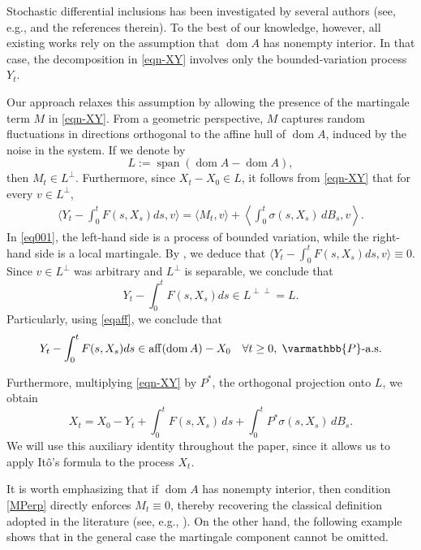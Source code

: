 \documentclass[11pt,reqno]{article}
\let\mathbb=\varmathbb
\newcommand{\dom}{\operatorname{dom}}
\newcommand{\1}{\mathds{1}}
\DeclareMathOperator{\aff}{aff}
\numberwithin{equation}{section}  %
\theoremstyle{plain}
\theoremstyle{definition}
\theoremstyle{remark}
\numberwithin{theorem}{section}
\numberwithin{remark}{section}
\numberwithin{example}{section}
\begin{document}
 Stochastic differential inclusions has been investigated by several authors (see, e.g., \cite{MR3308895} and the references therein). To the best of our knowledge, however, all existing works rely on the assumption that $\dom A$ has nonempty interior. In that case, the decomposition in \eqref{eqn-XY} involves only the bounded-variation process $Y_t$.  

Our approach relaxes this assumption by allowing the presence of the martingale term $M$ in \eqref{eqn-XY}. From a geometric perspective, $M$ captures random fluctuations in directions orthogonal to the affine hull of $\dom A$, induced by the noise in the system. If we denote by 
\[
    L := \operatorname{span}(\dom A - \dom A), 
\]
 then $M_t \in L^\perp$. Furthermore, since $X_t - X_0 \in L$, it follows from \eqref{eqn-XY} that for every $v \in L^\perp$,
\begin{align}\label{eq001}
   \langle Y_t - \int_0^t F(s,X_s)ds  , v\rangle = \langle M_t , v\rangle + \left\langle \int_0^t \sigma(s,X_s)\,dB_s , v \right\rangle.  
\end{align}
In \eqref{eq001}, the left-hand side is a process of bounded variation, while the right-hand side is a local martingale. By \cite[Theorem~4.8]{MR3497465}, we deduce that $\langle Y_t - \int_0^t F(s,X_s)ds  , v\rangle \equiv 0$. Since $v \in L^\perp$ was arbitrary and $L^\perp$ is separable, we conclude that $$Y_t - \int_0^t F(s,X_s)ds  \in L^{\perp \perp } = L.$$ Particularly, using \eqref{eqaff}, we conclude that 
\begin{align}\label{YbelongAFF}
Y_t - \int_0^t F(s,X_s)ds \in \aff (\dom A) -X_0  \quad  \forall t \geq 0,\; \mathbb{P}\text{-a.s.}
\end{align}
   
Furthermore, multiplying \eqref{eqn-XY} by $P^\ast$, the orthogonal projection onto $L$, we obtain
\begin{equation}\label{eqn-XY_Auxiliar}
X_t
  = X_0 - Y_t
  + \int_0^t  F(s,X_s)\,ds
  + \int_0^t P^\ast \sigma(s,X_s)\,dB_s .
\end{equation}
We will use this auxiliary identity throughout the paper, since it allows us to apply It\^o's formula to the process $X_t$.



It is worth emphasizing that if $\dom A$ has nonempty interior, then condition \eqref{MPerp} directly enforces $M_t \equiv 0$, thereby recovering the classical definition adopted in the literature (see, e.g., \cite{MR3308895}). On the other hand, the following example shows that in the general case the martingale component cannot be omitted.
\end{document}
